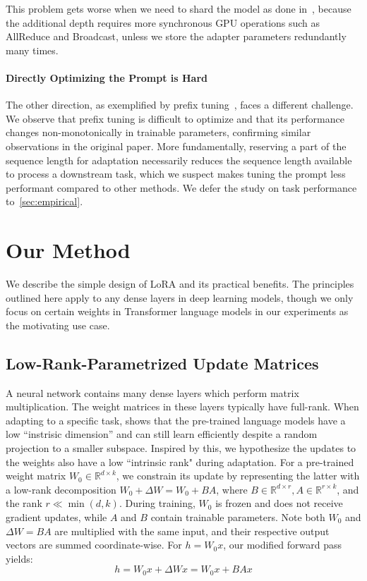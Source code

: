 \documentclass{article} %
\begin{document}
This problem gets worse when we need to shard the model as done in~\citet{shoeybi2020megatronlm, lepikhin2020gshard}, because the additional depth requires more synchronous GPU operations such as AllReduce and Broadcast, unless we store the adapter parameters redundantly many times.

\paragraph{Directly Optimizing the Prompt is Hard}
The other direction, as exemplified by prefix tuning~\citep{li_prefix-tuning_2021}, faces a different challenge.
We observe that prefix tuning is difficult to optimize and that its performance changes non-monotonically in trainable parameters, confirming similar observations in the original paper.
More fundamentally, reserving a part of the sequence length for adaptation necessarily reduces the sequence length available to process a downstream task, which we suspect makes tuning the prompt less performant compared to other methods.
We defer the study on task performance to~\autoref{sec:empirical}.

\section{Our Method}

We describe the simple design of LoRA and its practical benefits.
The principles outlined here apply to any dense layers in deep learning models, though we only focus on certain weights in Transformer language models in our experiments as the motivating use case.

\subsection{Low-Rank-Parametrized Update Matrices}
A neural network contains many dense layers which perform matrix multiplication.
The weight matrices in these layers typically have full-rank.
When adapting to a specific task, \citet{aghajanyan_intrinsic_2020} shows that the pre-trained language models have a low ``instrisic dimension'' and can still learn efficiently despite a random projection to a smaller subspace.
Inspired by this, we hypothesize the updates to the weights also have a low ``intrinsic rank" during adaptation.
For a pre-trained weight matrix $W_0\in \mathbb{R}^{d\times k}$, we constrain its update by representing the latter with a low-rank decomposition $W_0+\Delta W=W_0+BA$, where $B\in \mathbb{R}^{d\times r}, A\in \mathbb{R}^{r\times k}$, and the rank $r \ll \min(d,k)$.
During training, $W_0$ is frozen and does not receive gradient updates, while $A$ and $B$ contain trainable parameters.
Note both $W_0$ and $\Delta W=BA$ are multiplied with the same input, and their respective output vectors are summed coordinate-wise.
For $h = W_0x$, our modified forward pass yields:
\begin{equation}
h = W_0 x + \Delta W x = W_0 x + BA x
\label{eq:lora}
\end{equation}
\end{document}
